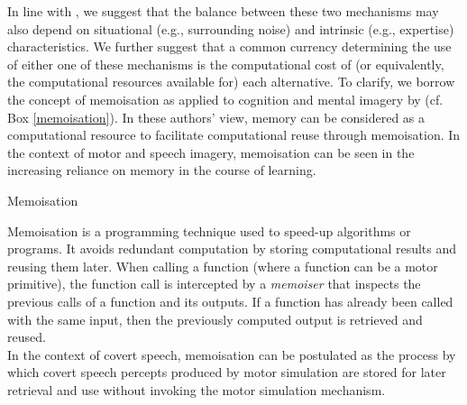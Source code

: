 \documentclass[utf8]{template/frontiersSCNS} %
\begin{document}
In line with \cite{tian_mental_2012}, we suggest that the balance between these two mechanisms may also depend on situational (e.g., surrounding noise) and intrinsic (e.g., expertise) characteristics. We further suggest that a common currency determining the use of either one of these mechanisms is the computational cost of (or equivalently, the computational resources available for) each alternative. To clarify, we borrow the concept of memoisation as applied to cognition and mental imagery by \cite{dasgupta_memory_2021} (cf. Box \ref{memoisation}). In these authors' view, memory can be considered as a computational resource to facilitate computational reuse through memoisation. In the context of motor and speech imagery, memoisation can be seen in the increasing reliance on memory in the course of learning.



\begin{mybox}[label=memoisation,float,floatplacement=!htb]{Memoisation}

Memoisation is a programming technique used to speed-up algorithms or programs. It avoids redundant computation by storing computational results and reusing them later. When calling a function (where a function can be a motor primitive), the function call is intercepted by a \textit{memoiser} that inspects the previous calls of a function and its outputs. If a function has already been called with the same input, then the previously computed output is retrieved and reused.\\

In the context of covert speech, memoisation can be postulated as the process by which covert speech percepts produced by motor simulation are stored for later retrieval and use without invoking the motor simulation mechanism. 

\end{mybox}
\end{document}
